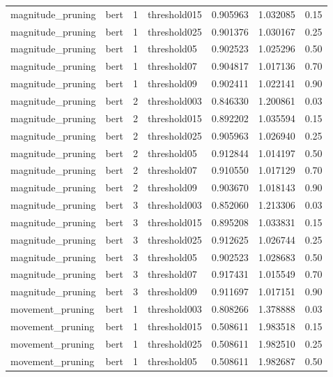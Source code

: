 \begin{tabular}{llllrrr}
    magnitude\_pruning &  bert &   1 & threshold015 &  0.905963 & 1.032085 &    0.15 \\
    magnitude\_pruning &  bert &   1 & threshold025 &  0.901376 & 1.030167 &    0.25 \\
    magnitude\_pruning &  bert &   1 &  threshold05 &  0.902523 & 1.025296 &    0.50 \\
    magnitude\_pruning &  bert &   1 &  threshold07 &  0.904817 & 1.017136 &    0.70 \\
    magnitude\_pruning &  bert &   1 &  threshold09 &  0.902411 & 1.022141 &    0.90 \\
    magnitude\_pruning &  bert &   2 & threshold003 &  0.846330 & 1.200861 &    0.03 \\
    magnitude\_pruning &  bert &   2 & threshold015 &  0.892202 & 1.035594 &    0.15 \\
    magnitude\_pruning &  bert &   2 & threshold025 &  0.905963 & 1.026940 &    0.25 \\
    magnitude\_pruning &  bert &   2 &  threshold05 &  0.912844 & 1.014197 &    0.50 \\
    magnitude\_pruning &  bert &   2 &  threshold07 &  0.910550 & 1.017129 &    0.70 \\
    magnitude\_pruning &  bert &   2 &  threshold09 &  0.903670 & 1.018143 &    0.90 \\
    magnitude\_pruning &  bert &   3 & threshold003 &  0.852060 & 1.213306 &    0.03 \\
    magnitude\_pruning &  bert &   3 & threshold015 &  0.895208 & 1.033831 &    0.15 \\
    magnitude\_pruning &  bert &   3 & threshold025 &  0.912625 & 1.026744 &    0.25 \\
    magnitude\_pruning &  bert &   3 &  threshold05 &  0.902523 & 1.028683 &    0.50 \\
    magnitude\_pruning &  bert &   3 &  threshold07 &  0.917431 & 1.015549 &    0.70 \\
    magnitude\_pruning &  bert &   3 &  threshold09 &  0.911697 & 1.017151 &    0.90 \\
     movement\_pruning &  bert &   1 & threshold003 &  0.808266 & 1.378888 &    0.03 \\
     movement\_pruning &  bert &   1 & threshold015 &  0.508611 & 1.983518 &    0.15 \\
     movement\_pruning &  bert &   1 & threshold025 &  0.508611 & 1.982510 &    0.25 \\
     movement\_pruning &  bert &   1 &  threshold05 &  0.508611 & 1.982687 &    0.50 \\

\end{tabular}
